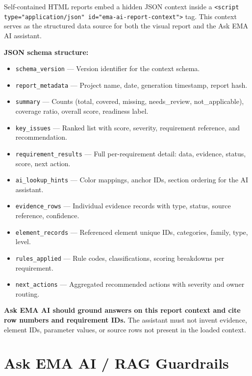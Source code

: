 \documentclass[10pt,letterpaper]{article}
\newcommand{\strong}[1]{\textbf{\textcolor{emaNavy}{#1}}}
\newcommand{\code}[1]{\texttt{#1}}
\newcommand{\guardrailbox}[1]{%
\begin{tcolorbox}[colback=guardrailBlue,colframe=guardrailBorder,
    boxrule=0.6pt,arc=2mm,left=10pt,right=10pt,top=8pt,bottom=8pt]\small #1%
\end{tcolorbox}}
\begin{document}
Self-contained HTML reports embed a hidden JSON context inside a
\code{<script type="application/json" id="ema-ai-report-context">} tag. This context serves as the
structured data source for both the visual report and the Ask EMA AI assistant.

\vspace{4pt}
\begin{tcolorbox}[colback=emaSoft2]
\small
\strong{JSON schema structure:}
\begin{itemize}
  \item \code{schema\_version} --- Version identifier for the context schema.
  \item \code{report\_metadata} --- Project name, date, generation timestamp, report hash.
  \item \code{summary} --- Counts (total, covered, missing, needs\_review, not\_applicable),
        coverage ratio, overall score, readiness label.
  \item \code{key\_issues} --- Ranked list with score, severity, requirement reference, and
        recommendation.
  \item \code{requirement\_results} --- Full per-requirement detail: data, evidence, status, score,
        next action.
  \item \code{ai\_lookup\_hints} --- Color mappings, anchor IDs, section ordering for the AI
        assistant.
  \item \code{evidence\_rows} --- Individual evidence records with type, status, source reference,
        confidence.
  \item \code{element\_records} --- Referenced element unique IDs, categories, family, type, level.
  \item \code{rules\_applied} --- Rule codes, classifications, scoring breakdowns per requirement.
  \item \code{next\_actions} --- Aggregated recommended actions with severity and owner routing.
\end{itemize}
\end{tcolorbox}

\guardrailbox{\strong{Ask EMA AI should ground answers on this report context and cite row numbers
  and requirement IDs.} The assistant must not invent evidence, element IDs, parameter values, or
  source rows not present in the loaded context.}

\section{Ask EMA AI / RAG Guardrails}
\end{document}
